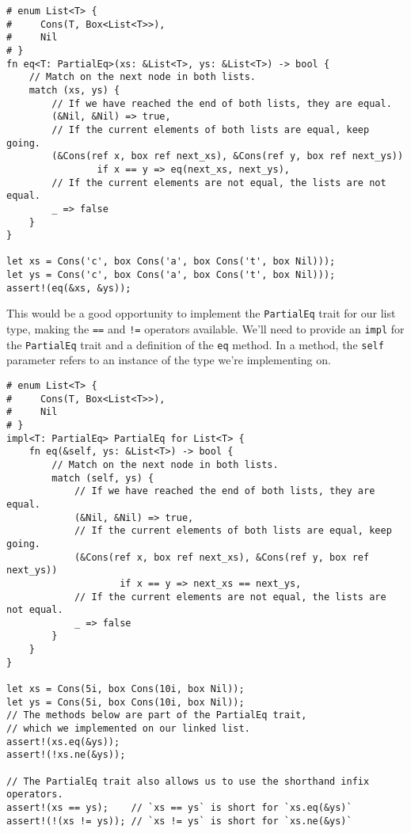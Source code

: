 \documentclass[]{article}
\begin{document}
\begin{verbatim}
# enum List<T> {
#     Cons(T, Box<List<T>>),
#     Nil
# }
fn eq<T: PartialEq>(xs: &List<T>, ys: &List<T>) -> bool {
    // Match on the next node in both lists.
    match (xs, ys) {
        // If we have reached the end of both lists, they are equal.
        (&Nil, &Nil) => true,
        // If the current elements of both lists are equal, keep going.
        (&Cons(ref x, box ref next_xs), &Cons(ref y, box ref next_ys))
                if x == y => eq(next_xs, next_ys),
        // If the current elements are not equal, the lists are not equal.
        _ => false
    }
}

let xs = Cons('c', box Cons('a', box Cons('t', box Nil)));
let ys = Cons('c', box Cons('a', box Cons('t', box Nil)));
assert!(eq(&xs, &ys));
\end{verbatim}

This would be a good opportunity to implement the \texttt{PartialEq}
trait for our list type, making the \texttt{==} and \texttt{!=}
operators available. We'll need to provide an \texttt{impl} for the
\texttt{PartialEq} trait and a definition of the \texttt{eq} method. In
a method, the \texttt{self} parameter refers to an instance of the type
we're implementing on.

\begin{verbatim}
# enum List<T> {
#     Cons(T, Box<List<T>>),
#     Nil
# }
impl<T: PartialEq> PartialEq for List<T> {
    fn eq(&self, ys: &List<T>) -> bool {
        // Match on the next node in both lists.
        match (self, ys) {
            // If we have reached the end of both lists, they are equal.
            (&Nil, &Nil) => true,
            // If the current elements of both lists are equal, keep going.
            (&Cons(ref x, box ref next_xs), &Cons(ref y, box ref next_ys))
                    if x == y => next_xs == next_ys,
            // If the current elements are not equal, the lists are not equal.
            _ => false
        }
    }
}

let xs = Cons(5i, box Cons(10i, box Nil));
let ys = Cons(5i, box Cons(10i, box Nil));
// The methods below are part of the PartialEq trait,
// which we implemented on our linked list.
assert!(xs.eq(&ys));
assert!(!xs.ne(&ys));

// The PartialEq trait also allows us to use the shorthand infix operators.
assert!(xs == ys);    // `xs == ys` is short for `xs.eq(&ys)`
assert!(!(xs != ys)); // `xs != ys` is short for `xs.ne(&ys)`
\end{verbatim}
\end{document}
